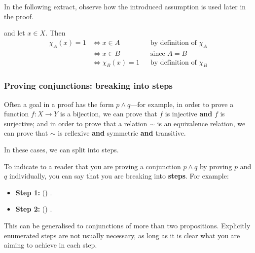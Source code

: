 In the following extract, observe how the introduced assumption is used later in the proof.

\begin{extract}
\label{xtrAssumeExample}
 and let $x \in X$. Then
\begin{align*}
\chi_A(x) = 1 & \Leftrightarrow x \in A && \text{by definition of $\chi_A$} \\
&\Leftrightarrow x \in B && \text{since $A=B$} \\
&\Leftrightarrow \chi_B(x) = 1 && \text{by definition of $\chi_B$}
\end{align*}
\end{extract}

\subsubsection*{Proving conjunctions: breaking into steps}

Often a goal in a proof has the form $p \wedge q$---for example, in order to prove a function $f : X \to Y$ is a bijection, we can prove that $f$ is injective \textbf{and} $f$ is surjective; and in order to prove that a relation $\sim$ is an equivalence relation, we can prove that $\sim$ is reflexive \textbf{and} symmetric \textbf{and} transitive.

In these cases, we can split into steps.

\begin{vocabulary}
\label{vcbSteps}
To indicate to a reader that you are proving a conjunction $p \wedge q$ by proving $p$ and $q$ individually, you can say that you are breaking into \textbf{steps}. For example:

\begin{vocabtemplate}
\begin{itemize}
\item \textbf{Step 1:} () .
\item \textbf{Step 2:} () .
\end{itemize}
\end{vocabtemplate}

This can be generalised to conjunctions of more than two propositions. Explicitly enumerated steps are not usually necessary, as long as it is clear what you are aiming to achieve in each step.
\end{vocabulary}

